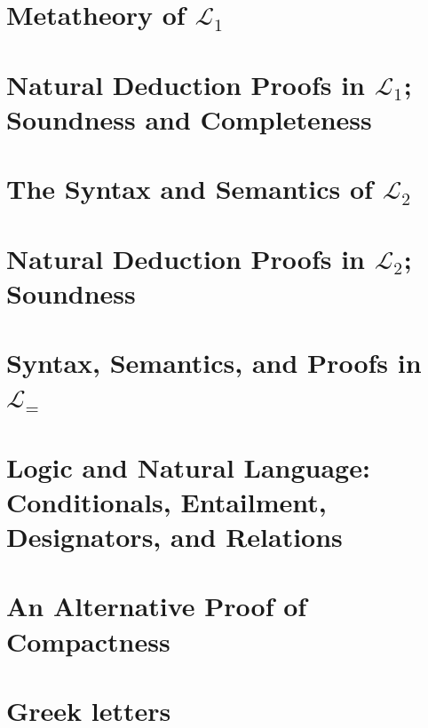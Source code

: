 \documentclass[openany,leqno,11pt,draft]{book}
\theoremstyle{break}
\theoremstyle{definition}
\theoremstyle{remark}
\newcommand{\lone}{\ensuremath{\mathcal{L}_{1}}}
\newcommand{\ltwo}{\ensuremath{\mathcal{L}_{2}}}
\begin{document}
\chapter{Metatheory of $\mathcal{L}_{1}$}\label{c4}
 

\newpage

\chapter[Natural Deduction in \lone]{Natural Deduction Proofs in $\mathcal{L}_{1}$; Soundness and Completeness}\label{c5}
  

\newpage

\chapter{The Syntax and Semantics of $\mathcal{L}_{2}$}\label{c6}
 

\newpage

\chapter[Natural Deduction in \ltwo]{Natural Deduction Proofs in \ltwo; Soundness}\label{c7}
 

\chapter{Syntax, Semantics, and Proofs in $\mathcal{L}_{=}$}\label{c8}
 


\newpage
\chapter[Logic and Natural Language]{Logic and Natural Language: Conditionals, Entailment, Designators, and Relations}\label{c9}



\appendix

\chapter[Alternative Proof of Compactness]{An Alternative Proof of Compactness}\label{altcomp}





\chapter{Greek letters}\label{greek}
\end{document}
